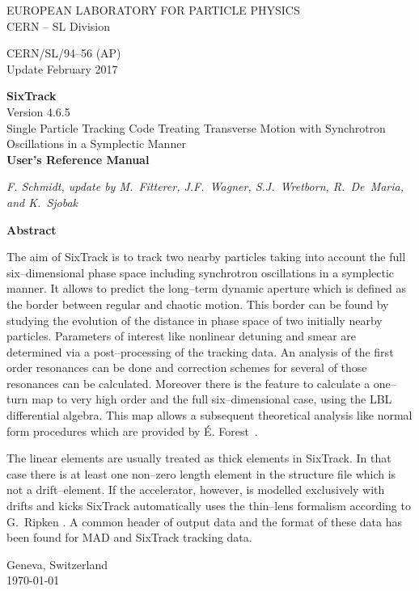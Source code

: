 \documentclass[a4paper,11pt]{report}
\begin{document}

\begin{titlepage}
\begin{center}\normalsize
  EUROPEAN LABORATORY FOR PARTICLE PHYSICS \\
  CERN -- SL Division
\end{center}
\vspace*{2mm}
\begin{flushright}
  CERN/SL/94--56  (AP) \\
  Update February 2017
\end{flushright}
\begin{center}\LARGE
  {\bf SixTrack} \\
  Version 4.6.5 \\
  {Single Particle Tracking Code Treating Transverse Motion with Synchrotron Oscillations in a Symplectic Manner} \\
  \vspace*{2mm} {\bf User's Reference Manual}
\end{center}
\begin{center}\em
  F. Schmidt, update by M.~Fitterer, J.F.~Wagner, S.J.~Wretborn, R.~De~Maria, and K.~Sjobak
\end{center}
\begin{center}\large
  {\bf Abstract} \\
\end{center}
The aim of SixTrack is to track two nearby particles taking into
account the full six--dimensional phase space including synchrotron
oscillations in a symplectic manner. It allows to predict the
long--term dynamic aperture which is defined as the border between
regular and chaotic motion. This border can be found by studying the
evolution of the distance in phase space of two initially nearby
particles.  Parameters of interest like nonlinear detuning and smear
are determined via a post--processing of the tracking data.  An
analysis of the first order resonances can be done and correction
schemes for several of those resonances can be calculated.  Moreover
there is the feature to calculate a one--turn map to very high order
and the full six--dimensional case, using the LBL differential
algebra. This map allows a subsequent theoretical 
analysis like normal form procedures which are provided by \'{E}.
Forest~\cite{DALIE}.

The linear elements are usually treated as thick elements in
SixTrack\@.  In that case there is at least one non--zero length
element in the structure file which is not a drift--element.  If the
accelerator, however, is modelled exclusively with drifts and kicks
SixTrack automatically uses the thin--lens formalism according to
G.~Ripken \cite{Ripken95}. A common header of output
data and the format of these data has been found for MAD and SixTrack
tracking data.

\vfill
\begin{center}
  Geneva, Switzerland \\
  \today
\end{center}

\end{titlepage}
\end{document}
